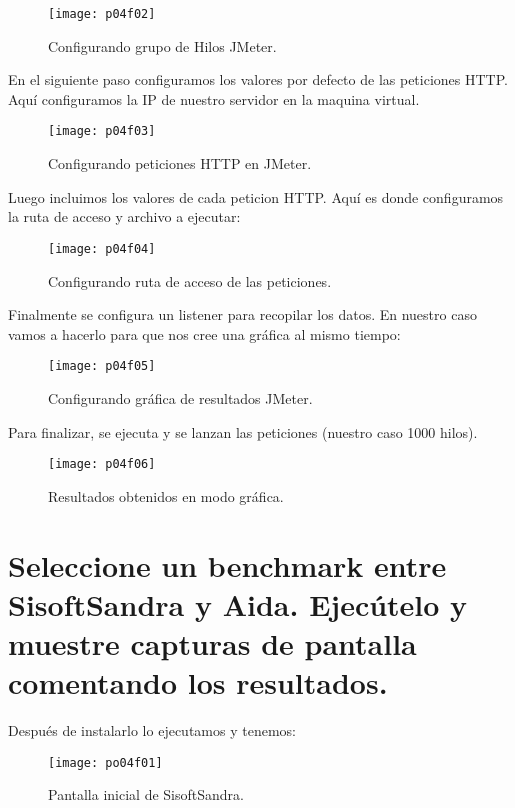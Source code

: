 \begin{figure}[H]
	\centering
	\texttt{[image: p04f02]}
	\caption{Configurando grupo de Hilos JMeter.}
	\label{fig:p04f02}
\end{figure}
\clearpage
En el siguiente paso configuramos los valores por defecto de las peticiones HTTP. Aquí configuramos la IP de nuestro servidor en la maquina virtual.
\begin{figure}[H]
	\centering
	\texttt{[image: p04f03]}
	\caption{Configurando peticiones HTTP en JMeter.}
	\label{fig:p04f03}
\end{figure}
\clearpage
Luego incluimos los valores de cada peticion HTTP. Aquí es donde configuramos la ruta de acceso y archivo a ejecutar:
\begin{figure}[H]
	\centering
	\texttt{[image: p04f04]}
	\caption{Configurando ruta de acceso de las peticiones.}
	\label{fig:p04f04}
\end{figure}
\clearpage
Finalmente se configura un listener para recopilar los datos. En nuestro caso vamos a hacerlo para que nos cree una gráfica al mismo tiempo:
\begin{figure}[H]
	\centering
	\texttt{[image: p04f05]}
	\caption{Configurando gráfica de resultados JMeter.}
	\label{fig:p04f05}
\end{figure}
\clearpage
Para finalizar, se ejecuta y se lanzan las peticiones (nuestro caso 1000 hilos).
\begin{figure}[H]
	\centering
	\texttt{[image: p04f06]}
	\caption{Resultados obtenidos en modo gráfica.}
	\label{fig:p04f06}
\end{figure}

\clearpage
\section{Seleccione un benchmark entre SisoftSandra y Aida.	Ejecútelo y muestre capturas de pantalla comentando los resultados.}

Después de instalarlo lo ejecutamos y tenemos:
\begin{figure}[H]
	\centering
	\texttt{[image: po04f01]}
	\caption{Pantalla inicial de SisoftSandra.}
	\label{fig:po04f01}
\end{figure}


